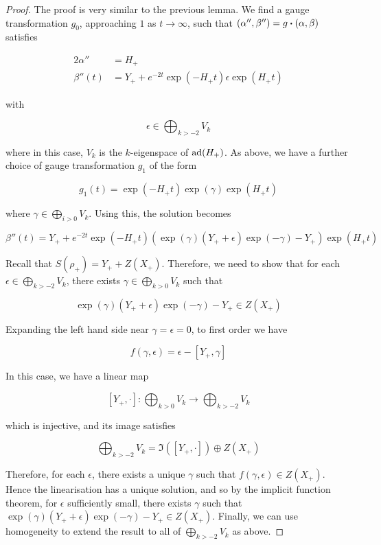 \documentclass{article}
\begin{document}
\begin{proof}
    The proof is very similar to the previous lemma. We find a gauge transformation \(g_0\), approaching \(1\) as \(t \to \infty\), such that \((\alpha'', \beta'') = g\vdot (\alpha, \beta)\) satisfies

    \begin{align*}
        2\alpha'' &= H_+ \\
        \beta''(t) &= Y_+ + e^{-2t}\exp(-H_+t)\epsilon\exp(H_+t)
    \end{align*}

    with

    \[\epsilon \in \bigoplus_{k > -2}V_k\]

    where in this case, \(V_k\) is the \(k\)-eigenspace of \(\operatorname{ad}(H_+)\). As above, we have a further choice of gauge transformation \(g_1\) of the form

    \[g_1(t) = \exp(-H_+t)\exp(\gamma)\exp(H_+t)\]

    where \(\gamma \in \bigoplus_{i > 0}V_k\). Using this, the solution becomes

    \[\beta''(t) = Y_+ + e^{-2t}\exp(-H_+t)(\exp(\gamma)(Y_+ + \epsilon)\exp(-\gamma) - Y_+)\exp(H_+t)\]

    Recall that \(S(\rho_+) = Y_+ + Z(X_+)\). Therefore, we need to show that for each \(\epsilon \in \bigoplus\limits_{k > -2}V_k\), there exists \(\gamma \in \bigoplus\limits_{k > 0}V_k\) such that

    \[\exp(\gamma)(Y_+ + \epsilon)\exp(-\gamma) - Y_+ \in Z(X_+)\]

    Expanding the left hand side near \(\gamma = \epsilon = 0\), to first order we have

    \[f(\gamma, \epsilon) = \epsilon - [Y_+, \gamma]\]

    In this case, we have a linear map

    \[[Y_+, \cdot] : \bigoplus_{k > 0}V_k \to \bigoplus_{k > -2}V_k\]

    which is injective, and its image satisfies

    \[\bigoplus_{k > -2} V_k = \Im([Y_+, \cdot]) \oplus Z(X_+)\]

    Therefore, for each \(\epsilon\), there exists a unique \(\gamma\) such that \(f(\gamma, \epsilon) \in Z(X_+)\). Hence the linearisation has a unique solution, and so by the implicit function theorem, for \(\epsilon\) sufficiently small, there exists \(\gamma\) such that \(\exp(\gamma)(Y_+ + \epsilon)\exp(-\gamma) - Y_+ \in Z(X_+)\). Finally, we can use homogeneity to extend the result to all of \(\bigoplus\limits_{k > -2}V_k\) as above.
\end{proof}
\end{document}
